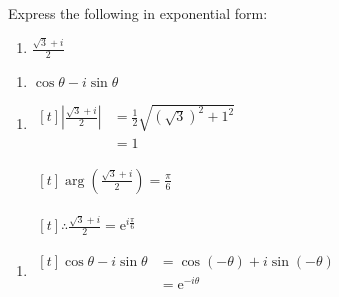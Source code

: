 \documentclass[11pt,a4paper]{book}
\begin{document}
\begin{example}

Express the following in exponential form:

\begin{minipage}[t]{0.5\textwidth}

\begin{enumerate}[label=(\alph*)]

\item  ${\displaystyle \frac{\sqrt{3}+i}{2}}$

\end{enumerate}

\end{minipage}
\begin{minipage}[t]{0.5\textwidth}

\begin{enumerate}[label=(\alph*),start=2]

\item  $\cos\theta-i\sin\theta$

\end{enumerate}

\end{minipage}

\medskip{}

\Solution

\begin{minipage}[t]{0.5\textwidth}

\begin{enumerate}[label=(\alph*)]

\item
$
\begin{aligned}[t]
\left|\frac{\sqrt{3}+i}{2}\right| & =\frac{1}{2}\sqrt{\left(\sqrt{3}\right)^{2}+1^{2}}\\
 & =1
\end{aligned}
$

$
\begin{aligned}[t]
\arg\left(\frac{\sqrt{3}+i}{2}\right)=\frac{\pi}{6}
\end{aligned}
$

$
\begin{aligned}[t]
\therefore\frac{\sqrt{3}+i}{2}=\mathrm{e}^{i\frac{\pi}{6}}
\end{aligned}
$

\end{enumerate}

\end{minipage}
\begin{minipage}[t]{0.5\textwidth}

\begin{enumerate}[label=(\alph*),start=2]

\item
$
\begin{aligned}[t]
\cos\theta-i\sin\theta & =\cos\left(-\theta\right)+i\sin\left(-\theta\right)\\
 & =\mathrm{e}^{-i\theta}
\end{aligned}
$

\end{enumerate}

\end{minipage}

\end{example}
\end{document}

